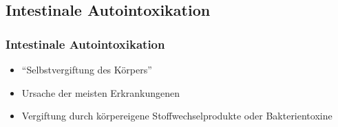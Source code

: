 \documentclass[xcolor=dvipsnames]{beamer}
\begin{document}
    \subsection{Intestinale Autointoxikation}
    \begin{frame}[allowframebreaks]
        \frametitle{Intestinale Autointoxikation}

        \begin{itemize}
            \setlength\itemsep{1em}
            \item "`Selbstvergiftung des Körpers"'
            \item Ursache der meisten Erkrankungenen
            \item Vergiftung durch körpereigene Stoffwechselprodukte oder Bakterientoxine
        \end{itemize}


\end{frame}
\end{document}
